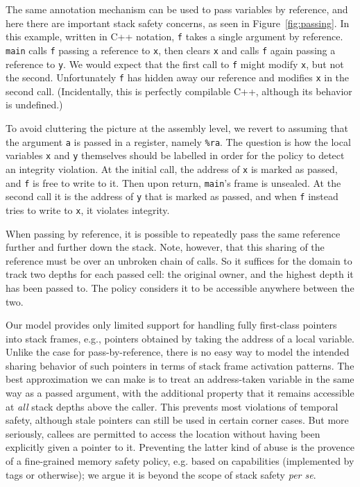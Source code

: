 \documentclass[acmsmall,review,anonymous]{acmart}\settopmatter{printfolios=true,printccs=false,printacmref=false}
\begin{document}
{The same annotation mechanism can be used to pass
variables by reference, and here there are important stack safety concerns,
as seen in Figure~\ref{fig:passing}. In this example, written in C++ notation,
{\tt f} takes a single argument by reference.
{\tt main} calls {\tt f} passing a reference to {\tt x}, then clears {\tt x} and calls
{\tt f} again passing a reference to {\tt y}.
We would expect that the first call to {\tt f} might modify
{\tt x}, but not the second. Unfortunately {\tt f} has hidden away our reference and modifies
{\tt x} in the second call. (Incidentally, this is perfectly compilable C++, although its behavior is undefined.)

To avoid cluttering the picture at the assembly level, we revert to assuming that the
argument {\tt a} is passed in a register, namely {\tt \%ra}.
The question is how the local variables {\tt x} and {\tt y} themselves
should be labelled in order for the policy to detect an integrity violation.
At the initial call, the address of {\tt x} is marked as passed, and {\tt f} is free to write to it. Then upon
return, {\tt main}'s frame is unsealed. At the second call it is the address of {\tt y} that is marked as passed,
and when {\tt f} instead tries to write to {\tt x}, it violates integrity.

When passing by reference, it is possible to repeatedly pass the same reference further
and further down the stack. Note, however, that this sharing of the reference must be over
an unbroken chain of calls. So it suffices for the domain to track two depths for each passed
cell: the original owner, and the highest depth it has been passed to. The policy considers
it to be accessible anywhere between the two.

Our model provides only limited support for handling fully first-class pointers into
stack frames, e.g., pointers obtained by taking the address of a local variable.
Unlike the case for pass-by-reference, there is no easy way to model the intended
sharing behavior of such pointers in terms of stack frame activation patterns.
The best approximation we can make is to treat an address-taken variable in the
same way as a passed argument, with the additional property
that it remains accessible at \emph{all} stack depths above the caller.
This prevents most violations of temporal safety, although stale pointers can still be
used in certain corner cases.
But more seriously, callees are permitted to access the location without having
been explicitly given a pointer to it.  Preventing the latter kind of abuse
is the provence of a fine-grained memory safety policy, e.g. based on capabilities
(implemented by tags or otherwise); we argue it is beyond the scope of stack safety
\emph{per se}.

}
\end{document}
